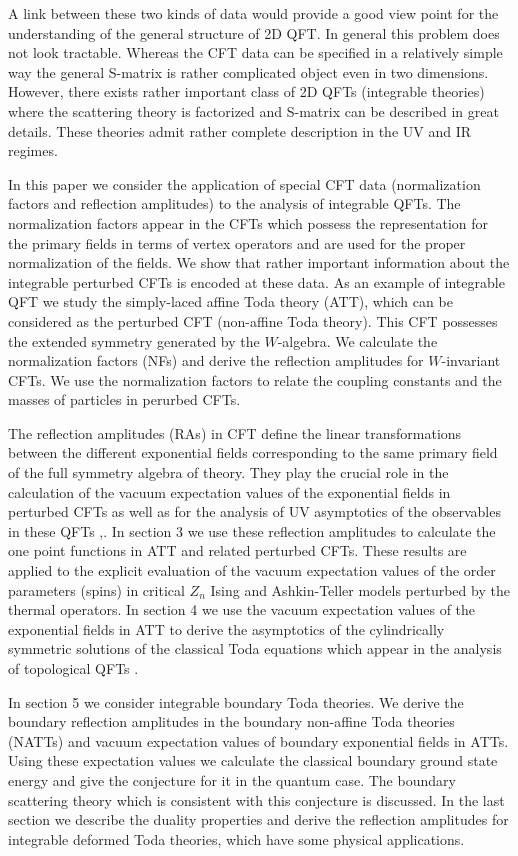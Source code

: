 \documentclass[a4paper,12pt]{article}
\begin{document}
A link between these two kinds of data would provide a good view point for
the understanding of the general structure of 2D QFT. In general this
problem does not look tractable. Whereas the CFT data can be specified in a
relatively simple way the general S-matrix is rather complicated object even
in two dimensions. However, there exists rather important class of 2D QFTs
(integrable theories) where the scattering theory is factorized and 
S-matrix can be described in great details. These theories admit rather
complete description in the UV and IR regimes.

In this paper we consider the application of special 
CFT data (normalization factors and reflection amplitudes) to the 
analysis of integrable QFTs. The normalization factors appear in the
CFTs which possess the representation for the primary fields in terms of
vertex operators and are used for the proper normalization of the fields. We
show that rather important information about the integrable perturbed CFTs
is encoded at these data. As an example of integrable QFT we study the
simply-laced affine Toda theory (ATT), which can be considered as the
perturbed CFT (non-affine Toda theory). This CFT possesses the extended
symmetry generated by the $W$-algebra. We calculate the normalization
factors (NFs) and derive the reflection amplitudes for $W$-invariant CFTs.
We use the normalization factors to relate the coupling constants and the 
masses of particles in perurbed CFTs.
 
The reflection amplitudes (RAs) in CFT define the linear transformations
between the different exponential fields corresponding to the same primary
field of the full symmetry algebra of theory. They play the crucial role in the calculation of
the vacuum expectation values of the exponential fields in perturbed CFTs 
\cite{FLZ} as well as for the analysis of UV asymptotics of the 
observables in these QFTs \cite{ZZ},\cite{AFR}. 
In section 3 we use these reflection amplitudes to
calculate the one point functions in ATT and related perturbed CFTs. These 
results are applied to the explicit evaluation of the vacuum expectation values of the order parameters (spins) in critical $Z_n$ Ising and 
Ashkin-Teller models 
perturbed by the thermal operators. In section 4 we use the vacuum 
expectation values of the exponential fields in ATT    
to derive  the asymptotics of the cylindrically symmetric solutions of the
classical Toda equations which appear in the analysis of topological QFTs 
\cite{CV}. 

In section 5 we consider integrable boundary Toda theories. We derive
the boundary reflection amplitudes in the boundary non-affine Toda theories
(NATTs) and vacuum expectation values of boundary exponential fields in 
ATTs. Using these expectation values we calculate the classical boundary ground 
state energy and give the conjecture for it in the quantum case. The boundary 
scattering theory which is consistent with this conjecture is discussed. 
In the last section we describe the duality properties and derive the
reflection amplitudes for integrable deformed Toda theories, which have some 
physical applications.
\end{document}
